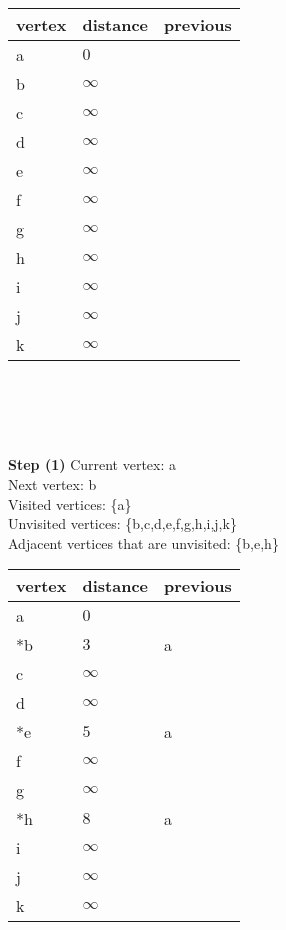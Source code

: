 \documentclass[11pt]{article}
\begin{document}
\begin{tabular}{|l|l|l|}
    \hline
    vertex & distance & previous \\
    \hline
    a & $0$ &  \\
    \hline
    b & $\infty$ &  \\
    \hline
    c & $\infty$ &  \\
    \hline
    d & $\infty$ &  \\
    \hline
    e & $\infty$ &  \\
    \hline
    f & $\infty$ &  \\
    \hline
    g & $\infty$ &  \\
    \hline
    h & $\infty$ &  \\
    \hline
    i & $\infty$ &  \\
    \hline
    j & $\infty$ &  \\
    \hline
    k & $\infty$ &  \\
    \hline
\end{tabular}
\\ \\
\\ \\
\textbf{Step (1)} Current vertex: a\\
Next vertex: b\\
Visited vertices: \{a\}\\
Unvisited vertices: \{b,c,d,e,f,g,h,i,j,k\}\\
Adjacent vertices that are unvisited: \{b,e,h\}\\
\begin{tabular}{|l|l|l|}
    \hline
    vertex & distance & previous \\
    \hline
    a & $0$ &  \\
    \hline
    *b & $3$ & a \\
    \hline
    c & $\infty$ &  \\
    \hline
    d & $\infty$ &  \\
    \hline
    *e & $5$ & a \\
    \hline
    f & $\infty$ &  \\
    \hline
    g & $\infty$ &  \\
    \hline
    *h & $8$ & a \\
    \hline
    i & $\infty$ &  \\
    \hline
    j & $\infty$ &  \\
    \hline
    k & $\infty$ &  \\
    \hline
\end{tabular}
\\ \\
\end{document}
